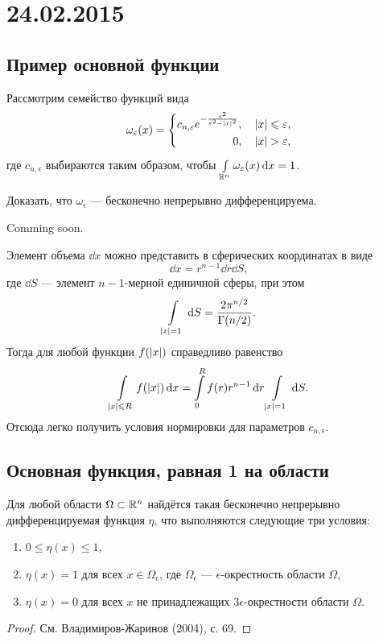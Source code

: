 \section{24.02.2015}
\subsection{Пример основной функции}
Рассмотрим семейство функций вида
\[ \omega_\varepsilon(x) =
    \left\{\begin{aligned}
        c_{n,\varepsilon} e^{-\frac{\varepsilon^2}{\varepsilon^2 - \left|x\right|^2}}, \quad &\left|x\right| \leqslant \varepsilon,\\
        0, \quad &\left|x\right| > \varepsilon,
    \end{aligned}\right.
\]
где $c_{n,\epsilon}$ выбираются таким образом, чтобы $\int\limits_{\mathbb{R}^n}^{} \omega_\varepsilon(x) \,\mathrm{d}{x} = 1$.

\begin{task}
    Доказать, что $\omega_\epsilon$ --- бесконечно непрерывно дифференцируема.
\end{task}

\begin{solution}
    Comming soon.
\end{solution}

Элемент объема $\dd x$ можно представить в сферических координатах в виде
\[ \dd x = r^{n-1} \dd r \dd S, \]
где $\dd S$ --- элемент $n-1$-мерной единичной сферы, при этом
\[ \int\limits_{\left|x\right| = 1}^{}  \,\mathrm{d}{S} = \frac{2 \pi^{n/2}}{\Gamma(n/2)}. \]
Тогда для любой функции $f(\left|x\right|)$ справедливо равенство
\[ \int\limits_{\left|x\right| \leqslant R}^{} f(\left|x\right|) \,\mathrm{d}{x} = \int\limits_{0}^{R} f(r)r^{n-1} \,\mathrm{d}{r} \int\limits_{\left|x\right| = 1}^{}  \,\mathrm{d}{S}. \]
Отсюда легко получить условия нормировки для параметров $c_{n,\epsilon}$.

\subsection{Основная функция, равная 1 на области}
\begin{lemma}
    Для любой области $\Omega \subset \mathbb{R}^n$ найдётся такая бесконечно непрерывно дифференцируемая функция $\eta$, что выполняются следующие три условия:
    \begin{enumerate}
        \item $0 \leq \eta(x) \leq 1$,
        \item $\eta(x) = 1$ для всех $x \in \Omega_\epsilon$, где $\Omega_\epsilon$ --- $\epsilon$-окрестность области $\Omega$,
        \item $\eta(x) = 0$ для всех $x$ не принадлежащих $3\epsilon$-окрестности области $\Omega$.
    \end{enumerate}
\end{lemma}

\begin{proof}
    См. Владимиров-Жаринов (2004), с. 69.
\end{proof}
